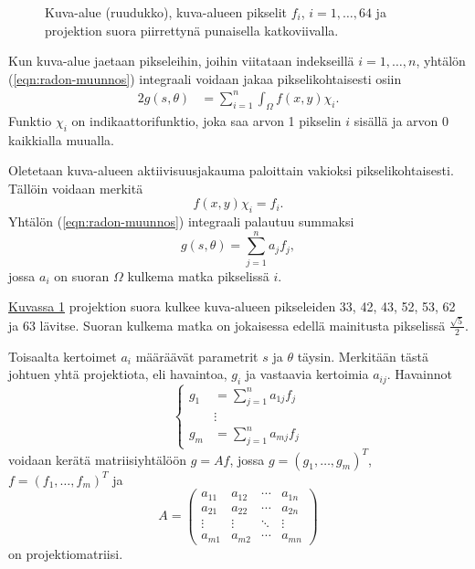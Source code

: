 \begin{figure}[H]
    \centering
    \captionsetup{width=.9\textwidth}
    
    \caption{Kuva-alue (ruudukko), kuva-alueen pikselit $f_i$, $i=1,\ldots,64$ ja projektion suora piirrettynä punaisella katkoviivalla.}
    \label{fig:diskreetti-projektio}
\end{figure}

Kun kuva-alue jaetaan pikseleihin, joihin viitataan indekseillä $i=1,\ldots, n$, yhtälön (\ref{eqn:radon-muunnos}) integraali voidaan jakaa pikselikohtaisesti osiin
\begin{alignat*}{2}
    g(s, \theta)
    &=\sum_{i=1}^{n}\int_{\Omega}f(x, y)\chi_{i}.
\end{alignat*}
Funktio $\chi_i$ on indikaattorifunktio, joka saa arvon 1 pikselin $i$ sisällä ja arvon 0 kaikkialla muualla.

Oletetaan kuva-alueen aktiivisuusjakauma paloittain vakioksi pikselikohtaisesti. Tällöin voidaan merkitä
\begin{equation*}
    f(x, y)\chi_{i}=f_i.
\end{equation*}
Yhtälön (\ref{eqn:radon-muunnos}) integraali palautuu summaksi
\begin{equation}\label{eqn:diskreetti-radon-muunnos}
    g(s, \theta)=\sum_{j=1}^{n}a_{j}f_{j},
\end{equation}
jossa $a_i$ on suoran $\Omega$ kulkema matka pikselissä $i$. 

\hyperref[fig:diskreetti-projektio]{Kuvassa \ref*{fig:diskreetti-projektio}} projektion suora kulkee kuva-alueen pikseleiden 33, 42, 43, 52, 53, 62 ja 63 lävitse. Suoran kulkema matka on jokaisessa edellä mainitusta pikselissä $\frac{\sqrt{5}}{2}$.

Toisaalta kertoimet $a_i$ määräävät parametrit $s$ ja $\theta$ täysin. Merkitään tästä johtuen yhtä projektiota, eli havaintoa, $g_i$ ja vastaavia kertoimia $a_{ij}$. Havainnot
\begin{equation*}
    \begin{cases}
        g_1&=\sum_{j=1}^{n}a_{1j}f_{j}\\
        &\vdots\\
        g_m&=\sum_{j=1}^{n}a_{mj}f_{j}
    \end{cases}
\end{equation*}
voidaan kerätä matriisiyhtälöön $g=Af$, jossa $g=\left( g_1, \ldots, g_m \right)^{T}$, $f=\left( f_1, \ldots, f_m \right)^{T}$ ja
\begin{equation*}
    A=
    \begin{pmatrix}
        a_{11} & a_{12} & \cdots & a_{1n} \\
        a_{21} & a_{22} & \cdots & a_{2n} \\
        \vdots & \vdots & \ddots & \vdots \\
        a_{m1} & a_{m2} & \cdots & a_{mn}
    \end{pmatrix}
\end{equation*}
on projektiomatriisi.

